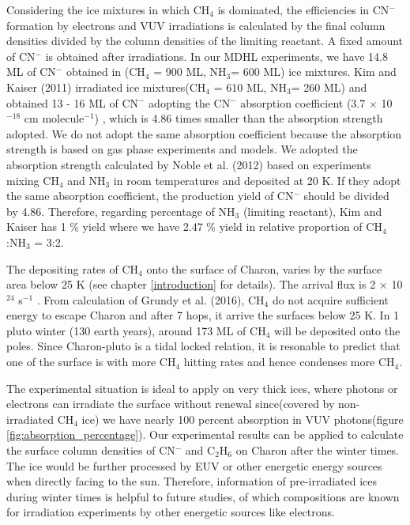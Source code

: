 Considering the ice mixtures in which CH$_4$ is dominated, the efficiencies in CN$^-$ formation by electrons and VUV irradiations is calculated by the final column densities divided by the column densities of the limiting reactant. A fixed amount of CN$^-$ is obtained after irradiations. In our MDHL experiments, we have 14.8 ML of CN$^-$ obtained in (CH$_4$ = 900 ML, NH$_3$= 600 ML) ice mixtures. Kim and Kaiser (2011) irradiated  ice mixtures(CH$_4$ = 610 ML, NH$_3$= 260 ML) and obtained 13 - 16 ML of CN$^-$ adopting the CN$^-$ absorption coefficient (3.7 $\times$ 10$^{-18}$ cm molecule$^{-1}$) \cite{georgieva2006computational}, which is 4.86 times smaller than the absorption strength adopted. We do not adopt the same absorption coefficient because the absorption strength is based on gas phase experiments and models. We adopted the absorption strength calculated by Noble et al. (2012) \cite{noble2012thermal} based on experiments mixing CH$_4$ and NH$_3$ in room temperatures and deposited at 20 K. If they adopt the same absorption coefficient, the production yield of CN$^-$ should be divided by 4.86. Therefore, regarding percentage of NH$_3$ (limiting reactant), Kim and Kaiser has 1 \% yield where we have 2.47 \% yield in relative proportion of CH$_4$:NH$_3$ = 3:2.

The depositing rates of CH$_4$ onto the surface of Charon, varies by the surface area below 25 K (see chapter \ref{introduction} for details). The arrival flux is 2 $\times$ 10$^{24}$ s$^{-1}$ \cite{hoey201}. From calculation of Grundy et al. (2016), CH$_4$ do not acquire sufficient energy to escape Charon and after 7 hops, it arrive the surfaces below 25 K. In 1 pluto winter (130 earth years), around 173 ML of CH$_4$ will be deposited onto the poles. Since Charon-pluto is a tidal locked relation, it is resonable to predict that one of the surface is with more CH$_4$ hitting rates and hence condenses more CH$_4$.

The experimental situation is ideal to apply on very thick ices, where photons or electrons can irradiate the surface without renewal since(covered by non-irradiated CH$_4$ ice) we have nearly 100 percent absorption in VUV photons(figure \ref{fig:absorption_percentage}). Our experimental results can be applied to calculate the surface column densities of CN$^-$ and C$_2$H$_6$ on Charon after the winter times. The ice would be further processed by EUV or other energetic energy sources when directly facing to the sun. Therefore, information of pre-irradiated ices during winter times is helpful to future studies, of which compositions are known for irradiation experiments by other energetic sources like electrons.\\

